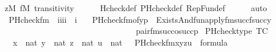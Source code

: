 \begin{isabellebody}
\ {\isacartoucheopen}z{\isasymin}M{\isacartoucheclose}\ {\isacartoucheopen}f{\isasymin}M{\isacartoucheclose}\ transitivity\isanewline
\ \ \ \ \isamarkupfalse%
\ Hcheck{\isacharunderscore}{\kern0pt}def\ PHcheck{\isacharunderscore}{\kern0pt}def\ RepFun{\isacharunderscore}{\kern0pt}def\isanewline
\ \ \ \ \isamarkupfalse%
\ auto\isanewline
{}\isamarkupfalse%
%
\endisatagproof
{\isafoldproof}%
%
\isadelimproof
\isanewline
%
\endisadelimproof
\isanewline
\isanewline
{}\isamarkupfalse%
\isanewline
\ \ PHcheck{\isacharunderscore}{\kern0pt}fm\ {\isacharcolon}{\kern0pt}{\isacharcolon}{\kern0pt}\ {\isachardoublequoteopen}{\isacharbrackleft}{\kern0pt}i{\isacharcomma}{\kern0pt}i{\isacharcomma}{\kern0pt}i{\isacharcomma}{\kern0pt}i{\isacharbrackright}{\kern0pt}\ {\isasymRightarrow}\ i{\isachardoublequoteclose}\ \isanewline
\ \ {\isachardoublequoteopen}PHcheck{\isacharunderscore}{\kern0pt}fm{\isacharparenleft}{\kern0pt}o{\isacharcomma}{\kern0pt}f{\isacharcomma}{\kern0pt}y{\isacharcomma}{\kern0pt}p{\isacharparenright}{\kern0pt}\ {\isasymequiv}\ Exists{\isacharparenleft}{\kern0pt}And{\isacharparenleft}{\kern0pt}fun{\isacharunderscore}{\kern0pt}apply{\isacharunderscore}{\kern0pt}fm{\isacharparenleft}{\kern0pt}succ{\isacharparenleft}{\kern0pt}f{\isacharparenright}{\kern0pt}{\isacharcomma}{\kern0pt}succ{\isacharparenleft}{\kern0pt}y{\isacharparenright}{\kern0pt}{\isacharcomma}{\kern0pt}{}{\isacharparenright}{\kern0pt}\isanewline
\ \ \ \ \ \ \ \ \ \ \ \ \ \ \ \ \ \ \ \ \ \ \ \ \ \ \ \ \ \ \ \ \ {\isacharcomma}{\kern0pt}pair{\isacharunderscore}{\kern0pt}fm{\isacharparenleft}{\kern0pt}{}{\isacharcomma}{\kern0pt}succ{\isacharparenleft}{\kern0pt}o{\isacharparenright}{\kern0pt}{\isacharcomma}{\kern0pt}succ{\isacharparenleft}{\kern0pt}p{\isacharparenright}{\kern0pt}{\isacharparenright}{\kern0pt}{\isacharparenright}{\kern0pt}{\isacharparenright}{\kern0pt}{\isachardoublequoteclose}\isanewline
\isanewline
{}\isamarkupfalse%
\ PHcheck{\isacharunderscore}{\kern0pt}type\ {\isacharbrackleft}{\kern0pt}TC{\isacharbrackright}{\kern0pt}{\isacharcolon}{\kern0pt}\isanewline
\ \ {\isachardoublequoteopen}{\isasymlbrakk}\ x\ {\isasymin}\ nat{\isacharsemicolon}{\kern0pt}\ y\ {\isasymin}\ nat{\isacharsemicolon}{\kern0pt}\ z\ {\isasymin}\ nat{\isacharsemicolon}{\kern0pt}\ u\ {\isasymin}\ nat\ {\isasymrbrakk}\ {\isasymLongrightarrow}\ PHcheck{\isacharunderscore}{\kern0pt}fm{\isacharparenleft}{\kern0pt}x{\isacharcomma}{\kern0pt}y{\isacharcomma}{\kern0pt}z{\isacharcomma}{\kern0pt}u{\isacharparenright}{\kern0pt}\ {\isasymin}\ formula{\isachardoublequoteclose}\isanewline

\end{isabellebody}
